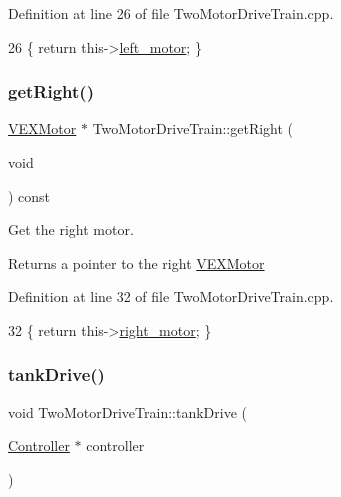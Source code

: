 Definition at line 26 of file Two\+Motor\+Drive\+Train.\+cpp.


\begin{DoxyCode}
26 \{ \textcolor{keywordflow}{return} this->\hyperlink{class_two_motor_drive_train_a134c95e1f45a5156924208cddaa3661f}{left\_motor}; \}
\end{DoxyCode}
\mbox{\label{class_two_motor_drive_train_a327a9691e057a60f06a9740cd4ef8c4c}} 
\subsubsection{\texorpdfstring{get\+Right()}{getRight()}}
{\footnotesize\ttfamily \hyperlink{class_v_e_x_motor}{V\+E\+X\+Motor} $\ast$ Two\+Motor\+Drive\+Train\+::get\+Right (\begin{DoxyParamCaption}\item[{void}]{ }\end{DoxyParamCaption}) const}



Get the right motor. 

\begin{DoxyReturn}{Returns}
a pointer to the right \hyperlink{class_v_e_x_motor}{V\+E\+X\+Motor} 
\end{DoxyReturn}


Definition at line 32 of file Two\+Motor\+Drive\+Train.\+cpp.


\begin{DoxyCode}
32 \{ \textcolor{keywordflow}{return} this->\hyperlink{class_two_motor_drive_train_a0bdefa7c731c2407ad4a4dad0902bbd3}{right\_motor}; \}
\end{DoxyCode}
\mbox{\label{class_two_motor_drive_train_a6a94c7396365b9ce4c09519a967f6111}} 
\subsubsection{\texorpdfstring{tank\+Drive()}{tankDrive()}\hspace{0.1cm}{\footnotesize\ttfamily [1/2]}}
{\footnotesize\ttfamily void Two\+Motor\+Drive\+Train\+::tank\+Drive (\begin{DoxyParamCaption}\item[{\hyperlink{class_controller}{Controller} $\ast$}]{controller }\end{DoxyParamCaption})}



